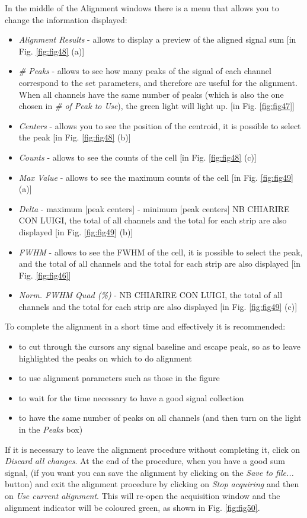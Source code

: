 \documentclass[a4paper,12pt,oneside,pdflatex,italian,final,twocolumn]{article}
\begin{document}
In the middle of the Alignment windows there is a menu that allows you to change the information displayed:
\begin{itemize}
    \item \textit{Alignment Results} - allows to display a preview of the aligned signal sum [in Fig. \ref{fig:fig48} (a)]
    \item \textit{\# Peaks} - allows to see how many peaks of the signal of each channel correspond to the set parameters, and therefore are useful for the alignment. When all channels have the same number of peaks (which is also the one chosen in \textit{# of Peak to Use}), the green light will light up. [in Fig. \ref{fig:fig47}]
    \item \textit{Centers} - allows you to see the position of the centroid, it is possible to select the peak [in Fig. \ref{fig:fig48} (b)]
    \item \textit{Counts} - allows to see the counts of the cell [in Fig. \ref{fig:fig48} (c)]
    \item \textit{Max Value} - allows to see the maximum counts of the cell [in Fig. \ref{fig:fig49} (a)]
    \item \textit{Delta} - maximum [peak centers] - minimum [peak centers] NB CHIARIRE CON LUIGI, the total of all channels and the total for each strip are also displayed [in Fig. \ref{fig:fig49} (b)]
    \item \textit{FWHM} -  allows to see the FWHM of the cell, it is possible to select the peak, and the total of all channels and the total for each strip are also displayed [in Fig. \ref{fig:fig46}]  
    \item \textit{Norm. FWHM Quad (\%)} - NB CHIARIRE CON LUIGI, the total of all channels and the total for each strip are also displayed [in Fig. \ref{fig:fig49} (c)]
\end{itemize}

To complete the alignment in a short time and effectively it is recommended:
\begin{itemize}
\item to cut through the cursors any signal baseline and escape peak, so as to leave highlighted the peaks on which to do alignment
\item to use alignment parameters such as those in the figure  
\item to wait for the time necessary to have a good signal collection
\item to have the same number of peaks on all channels (and then turn on the light in the \textit{Peaks} box)
\end{itemize}
If it is necessary to leave the alignment procedure without completing it, click on \textit{Discard all changes}.
At the end of the procedure, when you have a good sum signal, (if you want you can save the alignment by clicking on the \textit{Save to file...} button) and  exit the alignment procedure by clicking on \textit{Stop acquiring} and then on \textit{Use current alignment}. This will re-open the acquisition window and the alignment indicator will be coloured green, as shown in Fig. \ref{fig:fig50}.
\end{document}

